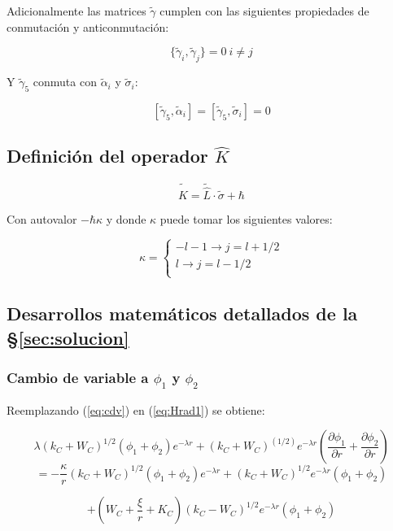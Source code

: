 \documentclass[a4paper, 12pt]{article} %
\begin{document}
Adicionalmente las matrices $\widetilde{\gamma}$ cumplen con las siguientes
propiedades de conmutaci\'on y anticonmutaci\'on:

\[
\{ \widetilde{\gamma}_i, \widetilde{\gamma}_j \} = 0 \ i \neq j
\]

Y $\widetilde{\gamma}_5$ conmuta con $\widetilde{\alpha}_i$ y $\widetilde{\sigma}_i$: 

\[
[\widetilde{\gamma}_5, \widetilde{\alpha}_i] = [\widetilde{\gamma}_5,\widetilde{\sigma}_i] = 0
\]

\subsection{Definici\'on del operador $\hat{K}$}\label{sec:k}

\begin{equation}
\widetilde{\hat{K}} = \widetilde{\hat{L}}\cdot \widetilde{\sigma} + \hbar
\end{equation}

Con autovalor $-\hbar \kappa$ y donde $\kappa$ puede tomar los siguientes
valores:

\[ \kappa = 
\begin{cases}
-l - 1 \rightarrow j = l + 1/2  \\
l \rightarrow j = l - 1/2 \\ 
\end{cases}
\]  


\subsection{Desarrollos matem\'aticos detallados de la \S \ref{sec:solucion}}\label{sec:pasoapaso}

\subsubsection{Cambio de variable a $\phi_1$ y $\phi_2$}

Reemplazando (\ref{eq:cdv}) en (\ref{eq:Hrad1})  se obtiene:

\[
\lambda (k_C + W_C)^{1/2}(\phi_1 + \phi_2)e^{-\lambda r} + (k_C + W_C)^(1/2)e^{-\lambda r}\left( \dfrac{\partial \phi_1}{\partial r} 
+ \dfrac{\partial \phi_2}{\partial r} \right)
\]
\[
 = - \dfrac{\kappa}{r}  (k_C + W_C)^{1/2}(\phi_1 + \phi_2)e^{-\lambda r} 
+ (k_C + W_C)^{1/2}e^{-\lambda r} (\phi_1 + \phi_2)
\]

\[
+ \left ( W_C + \dfrac{\xi}{r} + K_C \right )(k_C - W_C)^{1/2}e^{-\lambda r}(\phi_1 + \phi_2)
\]
\end{document}
